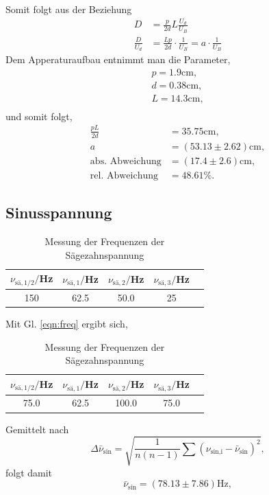 Somit folgt aus der Beziehung
\begin{align}
    D&=\frac{p}{2d}L\frac{U_d}{U_B}\\
    \label{eqn:f1}
    \frac{D}{U_d}&=\frac{Lp}{2d} \cdot \frac{1}{U_B}=a\cdot \frac{1}{U_B}
\end{align}
Dem Apperaturaufbau entnimmt man die Parameter,
\begin{align}
    p = 1.9\text{cm}, \\
    d = 0.38\text{cm},\\
    L = 14.3\text{cm},\\
\end{align}
und somit folgt,
\begin{align}
    \frac{pL}{2d} &=35.75\text{cm}, \\
    a &= (53.13\pm2.62)\text{cm},\\
    \textrm{abs. Abweichung} &=(17.4\pm2.6)\text{cm} ,\\
    \textrm{rel. Abweichung} &= 48.61\%.
\end{align}

\subsection{Sinusspannung}
\begin{table}
    \centering
    \begin{tabular}{c c c c c}
        \toprule
        $\nu_{\text{sä},1/2}/$Hz & $\nu_{\text{sä},1}/$Hz & $\nu_{\text{sä},2}/$Hz & $\nu_{\text{sä},3}/$Hz\\
        \midrule
        150 & 62.5 & 50.0 & 25\\ 
        \bottomrule
    \end{tabular}
    \caption{Messung der Frequenzen der Sägezahnspannung}
\end{table}

Mit Gl. \ref{eqn:freq} ergibt sich,
\begin{table}
    \centering
    \begin{tabular}{c c c c c}
        \toprule
        $\nu_{\text{sä},1/2}/$Hz & $\nu_{\text{sä},1}/$Hz & $\nu_{\text{sä},2}/$Hz & $\nu_{\text{sä},3}/$Hz \\
        \midrule
        75.0 & 62.5 & 100.0 & 75.0\\ 
        \bottomrule
    \end{tabular}
    \caption{Messung der Frequenzen der Sägezahnspannung}
\end{table}

Gemittelt nach
\begin{equation*}
    \Delta \bar{\nu}_{\text{sin}}=\sqrt{\frac{1}{n(n-1)}\sum{\left(\nu_{\text{sin,i}}-\bar{\nu}_{\text{sin}}\right)^2}},
\end{equation*}
folgt damit
\begin{equation}
    \bar{\nu}_{\text{sin}}=(78.13\pm 7.86)\text{Hz},
    \label{eqn:sin} 
\end{equation}

